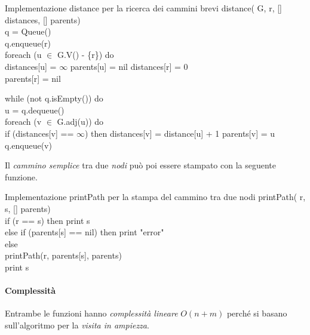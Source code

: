 \begin{minicode}{Implementazione distance per la ricerca dei cammini brevi}
    \ind distance( G,  r, [] distances, [] parents)\\
     q = Queue()\\
    q.enqueue(r)\\
    \indf foreach (u $\in$ G.V() - \{r\}) do\\
        distances[u] = $\infty$\hfill{}
        parents[u] = nil\hfill{}
    \indf distances[r] = 0\\
    \indf parents[r] = nil\hfill{}
\end{minicode}
\begin{codecont}
\begin{minipage}[t]{\textwidth}
    \indf while (not q.isEmpty()) do\\
     u = q.dequeue()\\
    \indff foreach (v $\in$ G.adj(u)) do\\
        \indfff if (distances[v] == $\infty$) then\hfill{}
            distances[v] = distance[u] + 1\hfill{}
            parents[v] = u\hfill{}
            q.enqueue(v)\\
\end{minipage}
\end{codecont}
Il \emph{cammino semplice} tra due \emph{nodi} può poi essere stampato con la
seguente funzione.
\begin{minicode}{Implementazione printPath per la stampa del cammino tra due nodi}
\ind printPath( r,  s, [] parents)\\
    \indf if (r == s) then\hfill{}
        print s\\
    \indf else if (parents[s] == nil) then\hfill{}
        print "error"\\
    \indf else\\
        printPath(r, parents[s], parents)\\
        print s
\end{minicode}

\paragraph{Complessità}
Entrambe le funzioni hanno \emph{complessità lineare} $O(n+m)$ perché si basano
sull'algoritmo per la \emph{visita in ampiezza}.

